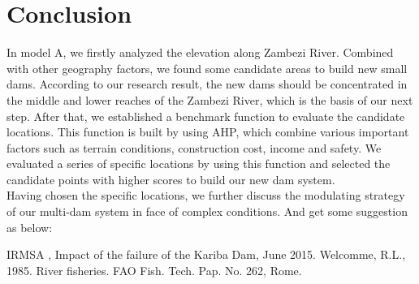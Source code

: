 \documentclass{mcmthesis}
\begin{document}
\section{Conclusion}
\indent \indent In model A, we firstly analyzed the elevation along Zambezi River. Combined with other geography factors, we found some candidate areas to build new small dams. According to our research result, the new dams should be concentrated in the middle and lower reaches of the Zambezi River, which is the basis of our next step. After that, we established a benchmark function to evaluate the candidate locations. This function is built by using AHP, which combine various important factors such as terrain conditions, construction cost, income and safety. We evaluated a series of specific locations by using this function and selected the candidate points with higher scores to build our new dam system.\\
\indent Having chosen the specific locations, we further discuss the modulating strategy of our multi-dam system in face of complex conditions. And get some suggestion as below:

\begin{thebibliography}{99}
 IRMSA , Impact of the failure of the Kariba Dam, June 2015.
 Welcomme, R.L., 1985. River fisheries. FAO Fish. Tech. Pap. No. 262, Rome.
\end{thebibliography}

\clearpage
\end{document}
